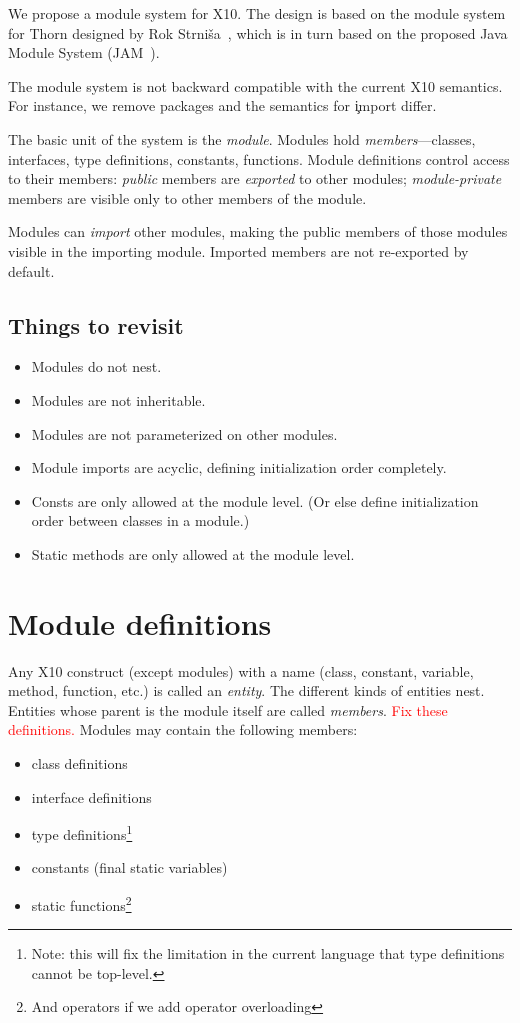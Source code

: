 \documentclass{article}
\newcommand\Xten{{\sf X10}\xspace}
\newcommand\RED[1]{\textcolor{red}{#1}}
\newcommand\TODO[1]{\RED{#1}}
\begin{document}
We propose a module system for \Xten.  The design is based on
the module system for Thorn
designed by Rok Strni\v{s}a~\cite{thorn}, which is in turn based
on the proposed Java Module System (JAM~\cite{SSP:07}).

The module system is not backward compatible with the current 
\Xten semantics.  For instance, we remove packages and the semantics for
\c{import} differ.

The basic unit of the system is the \emph{module}.
Modules hold \emph{members}---classes, interfaces,
type definitions, constants, functions.
Module definitions control access to their members:
\emph{public} members are \emph{exported} to other
modules;
\emph{module-private} members are visible only
to other members of the module.

Modules can \emph{import} other modules, making the public
members of those modules visible in the importing module.
Imported members are not re-exported by default.

\subsection{Things to revisit}

\begin{itemize}
\item Modules do not nest.
\item Modules are not inheritable.
\item Modules are not parameterized on other modules.
\item Module imports are acyclic, defining initialization order completely.
\item Consts are only allowed at the module level.
(Or else define initialization order between classes in a
module.)
\item Static methods are only allowed at the module level.
\end{itemize}

\section{Module definitions}

Any \Xten construct (except modules) with a
name (class, constant, variable, method,
function, etc.) is called an \emph{entity}.
The different kinds of entities nest.  Entities whose parent is
the module itself are called \emph{members}.
\TODO{Fix these definitions.}
Modules may contain the following members:
\begin{itemize}
\item class definitions
\item interface definitions
\item type definitions\footnote{Note: this will fix the limitation in the current language that type definitions cannot be top-level.}
\item constants (final static variables)
\item static functions\footnote{And operators if we add operator
overloading}
\end{itemize}
\end{document}
